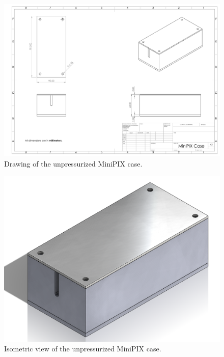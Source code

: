 \begin{centering}
  \begin{figure}[H]
    \includegraphics[width=\textwidth]{Figures/minipix-case.pdf}
    \caption{Drawing of the unpressurized MiniPIX case.}
    \label{fig:minipix-case-drawing}
  \end{figure}  
  \begin{figure}[H]
    \includegraphics[width=\textwidth]{Figures/minipix-case-closed.png}
    \caption{Isometric view of the unpressurized MiniPIX case.}
    \label{fig:minipix-case-closed-image}
  \end{figure}
  \begin{figure}[H]

\end{figure}
\end{centering}
